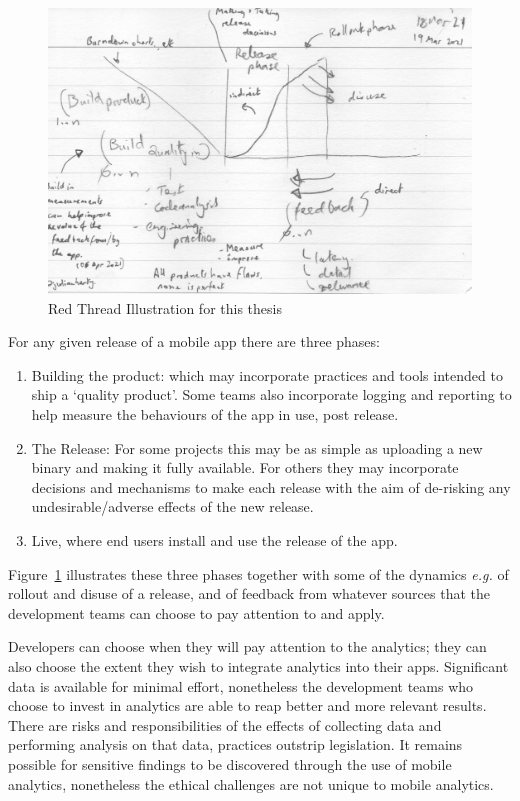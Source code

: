 \begin{figure}
    \centering
    \includegraphics[width=15cm]{images/rough-sketches/Red-Thread-Rough-Sketch.jpeg}
    \caption{Red Thread Illustration for this thesis}
    \label{fig:red-thread-for-this-thesis}
\end{figure}

For any given release of a mobile app there are three phases:
\begin{enumerate}
    \item Building the product: which may incorporate practices and tools intended to ship a `quality product'. Some teams also incorporate logging and reporting to help measure the behaviours of the app in use, post release.
    \item The Release: For some projects this may be as simple as uploading a new binary and making it fully available. For others they may incorporate decisions and mechanisms to make each release with the aim of de-risking any undesirable/adverse effects of the new release.
    \item Live, where end users install and use the release of the app.
\end{enumerate}

Figure~\ref{fig:red-thread-for-this-thesis} illustrates these three phases together with some of the dynamics \emph{e.g.} of rollout and disuse of a release, and of feedback from whatever sources that the development teams can choose to pay attention to and apply.

Developers can choose when they will pay attention to the analytics; they can also choose the extent they wish to integrate analytics into their apps. Significant data is available for minimal effort, nonetheless the development teams who choose to invest in analytics are able to reap better and more relevant results. There are risks and responsibilities of the effects of collecting data and performing analysis on that data, practices outstrip legislation. It remains possible for sensitive findings to be discovered through the use of mobile analytics, nonetheless the ethical challenges are not unique to mobile analytics.

